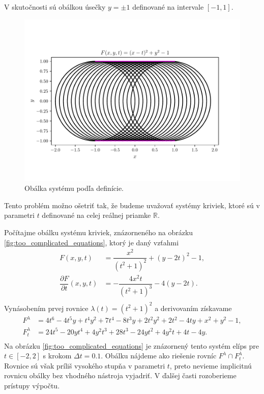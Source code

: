 V skutočnosti sú obálkou úsečky $y=\pm 1$ definované na intervale $[-1,1]$.

\begin{figure}[H]
	\centering
	\includegraphics[trim={0 1.65cm 0 2cm},clip]{images/system_with_correct_envelope.pdf}
	\caption{Obálka systému podľa definície.}
	\label{fig:system_with_correct_envelope}
\end{figure}

Tento problém možno ošetriť tak, že budeme uvažovať systémy kriviek, ktoré sú v parametri $t$ definované na celej reálnej priamke $\mathbb{R}$. 

\begin{example}
\label{example:too_complicated_equations}
Počítajme obálku systému kriviek, znázorneného na obrázku \ref{fig:too_complicated_equations}, ktorý je daný vzťahmi
\begin{align*}
F(x,y, t) &= \dfrac{x^2}{(t^2 + 1)^2} + (y - 2t)^2 - 1, \\
\dfrac{\partial F}{\partial t}(x, y, t) &= -\dfrac{4x^2t}{\left(t^2+1\right)^3}-4\left(y-2t\right). \\
\end{align*}
Vynásobením prvej rovnice $ \lambda(t) = (t^2 + 1)^2$ a derivovaním získavame
\begin{align*}
F^\lambda &= 4 t^6 - 4 t^5 y + t^4 y^2 + 7 t^4 - 8 t^3 y + 2 t^2 y^2 + 2 t^2 - 4 t y + x^2 + y^2 - 1, \\
F_t^\lambda &= 24t^5-20yt^4+4y^2t^3+28t^3-24yt^2+4y^2t+4t-4y. \\
\end{align*}
Na obrázku \ref{fig:too_complicated_equations} je znázornený tento systém elíps pre $t \in [-2,2]$ s krokom $\Delta t=0.1$. Obálku nájdeme ako riešenie rovníc $F^\lambda \cap F_t^\lambda. $ Rovnice sú však príliš vysokého stupňa v parametri $t$, preto nevieme implicitnú rovnicu obálky bez vhodného nástroja vyjadriť. V ďalšej časti rozoberieme prístupy výpočtu.
\end{example}

